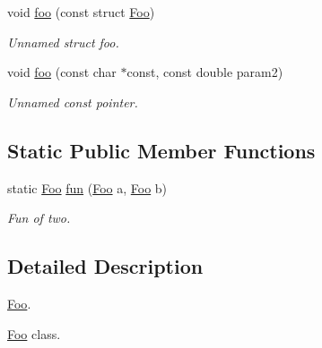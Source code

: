 \begin{DoxyCompactItemize}
void \mbox{\hyperlink{struct_foo_a0baba36cdd24740c6e39d5641e30a0fe}{foo}} (const struct \mbox{\hyperlink{struct_foo}{Foo}})
\begin{DoxyCompactList}\small\item\em Unnamed struct foo. \end{DoxyCompactList}\item 
\mbox{\label{struct_foo_abeaaeb54ad61db26205c06927968845f}} 
void \mbox{\hyperlink{struct_foo_abeaaeb54ad61db26205c06927968845f}{foo}} (const char $\ast$const, const double param2)
\begin{DoxyCompactList}\small\item\em Unnamed const pointer. \end{DoxyCompactList}\end{DoxyCompactItemize}
\subsection*{Static Public Member Functions}
\begin{DoxyCompactItemize}
\item 
static \mbox{\hyperlink{struct_foo}{Foo}} \mbox{\hyperlink{struct_foo_abdf64a71706807b0f946265902c530ee}{fun}} (\mbox{\hyperlink{struct_foo}{Foo}} a, \mbox{\hyperlink{struct_foo}{Foo}} b)
\begin{DoxyCompactList}\small\item\em Fun of two. \end{DoxyCompactList}\end{DoxyCompactItemize}


\subsection{Detailed Description}
\mbox{\hyperlink{struct_foo}{Foo}}. 

\mbox{\hyperlink{struct_foo}{Foo}} class.


